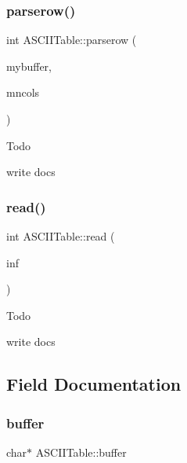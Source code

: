 \subsubsection{\texorpdfstring{parserow()}{parserow()}}
{\footnotesize\ttfamily int A\+S\+C\+I\+I\+Table\+::parserow (\begin{DoxyParamCaption}\item[{char $\ast$}]{mybuffer,  }\item[{int}]{mncols }\end{DoxyParamCaption})}

\begin{DoxyRefDesc}{Todo}
\item[\hyperlink{todo__todo000004}{Todo}]write docs \end{DoxyRefDesc}
\mbox{\label{classASCIITable_a5ec694dec500699648ef16693277bc22}} 
\subsubsection{\texorpdfstring{read()}{read()}}
{\footnotesize\ttfamily int A\+S\+C\+I\+I\+Table\+::read (\begin{DoxyParamCaption}\item[{const F\+I\+LE $\ast$}]{inf }\end{DoxyParamCaption})}

\begin{DoxyRefDesc}{Todo}
\item[\hyperlink{todo__todo000002}{Todo}]write docs \end{DoxyRefDesc}


\subsection{Field Documentation}
\mbox{\label{classASCIITable_a4207703c6053463369e7b735d2acade4}} 
\subsubsection{\texorpdfstring{buffer}{buffer}}
{\footnotesize\ttfamily char$\ast$ A\+S\+C\+I\+I\+Table\+::buffer}

\mbox{\label{classASCIITable_a13248c4b9e80f4097227d339dfdaa9f6}} 

